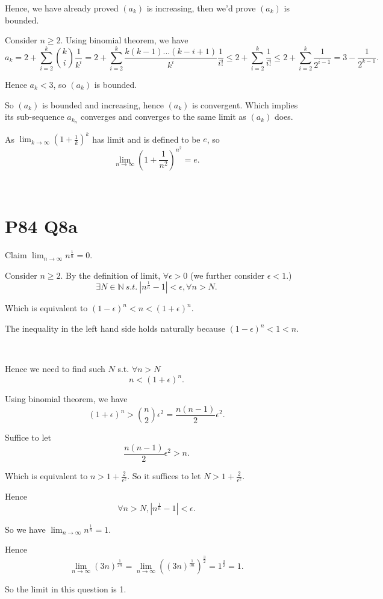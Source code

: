 \documentclass[12pt]{article}%
\begin{document}
Hence, we have already proved $(a_k)$ is increasing, then we'd prove $(a_k)$ is bounded. 

Consider $n\geq 2.$ Using binomial theorem, we have $$a_k=2+\sum_{i=2}^{k} \binom{k}{i}\frac{1}{k^i}=2+\sum_{i=2}^{k} \frac{k(k-1)...(k-i+1)}{k^i}\frac{1}{i!}\leq 2+ \sum_{i=2}^{k}\frac{1}{i!}\leq 2+\sum_{i=2}^{k}\frac{1}{2^{i-1}}=3-\frac{1}{2^{k-1}}.$$

Hence $a_k<3$, so $(a_k)$ is bounded.

So $(a_k)$ is bounded and increasing, hence $(a_k)$ is convergent. Which implies its sub-sequence $a_{k_n}$ converges and converges to the same limit as $(a_k)$ does. 

As $\lim_{k \to \infty} (1+\frac{1}{k})^k$ has limit and is defined to be $e$, so $$\lim_{n \to \infty} (1+\frac{1}{n^2})^{n^2}=e.$$

~\

\section{P84 Q8a}

Claim $\lim_{n \to \infty} n^{\frac{1}{n}}=0.$ 

Consider $n\geq 2.$ By the definition of limit, $\forall \epsilon >0$ (we further consider $\epsilon <1.$) 
$$\exists N \in \mathbb{N}~s.t.~|n^{\frac{1}{n}}-1|<\epsilon, \forall n>N.$$

Which is equivalent to $(1-\epsilon)^n<n<(1+\epsilon)^n.$ 

The inequality in the left hand side holds naturally because $(1-\epsilon)^n<1<n.$

~\

Hence we need to find such $N$ s.t. $\forall n>N$ $$n<(1+\epsilon)^n.$$

Using binomial theorem, we have $$(1+\epsilon)^n>\binom{n}{2}\epsilon^2=\frac{n(n-1)}{2}\epsilon^2.$$

Suffice to let $$\frac{n(n-1)}{2}\epsilon^2>n.$$ 

Which is equivalent to $n>1+\frac{2}{\epsilon^2}.$ So it suffices to let $N>1+\frac{2}{\epsilon^2}.$ 

Hence $$\forall n>N, |n^{\frac{1}{n}}-1|<\epsilon.$$ 

So we have $\lim_{n \to \infty}n^{\frac{1}{n}}=1.$

Hence $$\lim_{n \to \infty}(3n)^{\frac{1}{2n}}=\lim_{n \to \infty}((3n)^{\frac{1}{3n}})^{\frac{3}{2}}=1^{\frac{3}{2}}=1.$$

So the limit in this question is 1.
\end{document}
